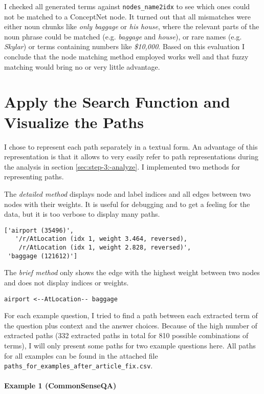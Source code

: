 \documentclass{article}
\begin{document}
I checked all generated terms against \verb|nodes_name2idx| to see
which ones could not be matched to a ConceptNet node.  It turned out
that all mismatches were either noun chunks like \emph{only baggage}
or \emph{his house}, where the relevant parts of the noun phrase could
be matched (e.g. \emph{baggage} and \emph{house}), or rare names
(e.g. \emph{Skylar}) or terms containing numbers like \emph{\$10,000}. Based
on this evaluation I conclude that the node matching method employed
works well and that fuzzy matching would bring no or very little
advantage.

\section{Apply the Search Function and Visualize the Paths}
\label{sec:step-2:-use}

I chose to represent each path separately in a textual form. An
advantage of this representation is that it allows to very easily
refer to path representations during the analysis in
section \ref{sec:step-3:-analyze}.  I implemented two methods for
representing paths.

The \emph{detailed method} displays node and label indices and all edges
between two nodes with their weights. It is useful for debugging and
to get a feeling for the data, but it is too verbose to display many
paths.

\begin{verbatim}
['airport (35496)',
   '/r/AtLocation (idx 1, weight 3.464, reversed),
    /r/AtLocation (idx 1, weight 2.828, reversed)',
 'baggage (121612)']
\end{verbatim}

The \emph{brief method} only shows the edge with the highest weight
between two nodes and does not display indices or weights.

\begin{verbatim}
airport <--AtLocation-- baggage
\end{verbatim}

For each example question, I tried to find a path between each
extracted term of the question plus context and the answer
choices.   Because of the high number of extracted paths (332 extracted
paths in total for 810 possible combinations of terms), I will only
present some paths for two example questions here. All paths for all
examples can be found in the attached file
\verb|paths_for_examples_after_article_fix.csv|.


\paragraph{Example 1 (CommonSenseQA)}
\end{document}
